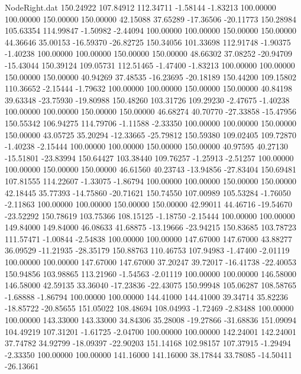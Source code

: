 \begin{filecontents}{NodeRight.dat}
 150.24922  107.84912  112.34711    -1.58144   -1.83213  100.00000  100.00000  150.00000  150.00000   42.15088   37.65289  -17.36506  -20.11773
 150.28984  105.63354  114.99847    -1.50982   -2.44094  100.00000  100.00000  150.00000  150.00000   44.36646   35.00153  -16.59370  -26.82725
 150.34056  101.33698  112.91748    -1.90375   -1.40238  100.00000  100.00000  150.00000  150.00000   48.66302   37.08252  -20.94709  -15.43044
 150.39124  109.05731  112.51465    -1.47400   -1.83213  100.00000  100.00000  150.00000  150.00000   40.94269   37.48535  -16.23695  -20.18189
 150.44200  109.15802  110.36652    -2.15444   -1.79632  100.00000  100.00000  150.00000  150.00000   40.84198   39.63348  -23.75930  -19.80988
 150.48260  103.31726  109.29230    -2.47675   -1.40238  100.00000  100.00000  150.00000  150.00000   46.68274   40.70770  -27.33858  -15.47956
 150.55342  106.94275  114.79706    -1.11588   -2.33350  100.00000  100.00000  150.00000  150.00000   43.05725   35.20294  -12.33665  -25.79812
 150.59380  109.02405  109.72870    -1.40238   -2.15444  100.00000  100.00000  150.00000  150.00000   40.97595   40.27130  -15.51801  -23.83994
 150.64427  103.38440  109.76257    -1.25913   -2.51257  100.00000  100.00000  150.00000  150.00000   46.61560   40.23743  -13.94856  -27.83404
 150.69481  107.81555  114.22607    -1.33075   -1.86794  100.00000  100.00000  150.00000  150.00000   42.18445   35.77393  -14.75860  -20.71621
 150.74550  107.00989  105.53284    -1.76050   -2.11863  100.00000  100.00000  150.00000  150.00000   42.99011   44.46716  -19.54670  -23.52292
 150.78619  103.75366  108.15125    -1.18750   -2.15444  100.00000  100.00000  149.84000  149.84000   46.08633   41.68875  -13.19666  -23.94215
 150.83685  103.78723  111.57471    -1.00844   -2.54838  100.00000  100.00000  147.67000  147.67000   43.88277   36.09529  -11.21935  -28.35179
 150.88763  110.46753  107.94983    -1.47400   -2.01119  100.00000  100.00000  147.67000  147.67000   37.20247   39.72017  -16.41738  -22.40053
 150.94856  103.98865  113.21960    -1.54563   -2.01119  100.00000  100.00000  146.58000  146.58000   42.59135   33.36040  -17.23836  -22.43075
 150.99948  105.06287  108.58765    -1.68888   -1.86794  100.00000  100.00000  144.41000  144.41000   39.34714   35.82236  -18.85722  -20.85655
 151.05022  108.48694  108.04993    -1.72469   -2.83488  100.00000  100.00000  143.33000  143.33000   34.84306   35.28008  -19.27866  -31.68836
 151.09094  104.49219  107.31201    -1.61725   -2.04700  100.00000  100.00000  142.24001  142.24001   37.74782   34.92799  -18.09397  -22.90203
 151.14168  102.98157  107.37915    -1.29494   -2.33350  100.00000  100.00000  141.16000  141.16000   38.17844   33.78085  -14.50411  -26.13661

\end{filecontents}
